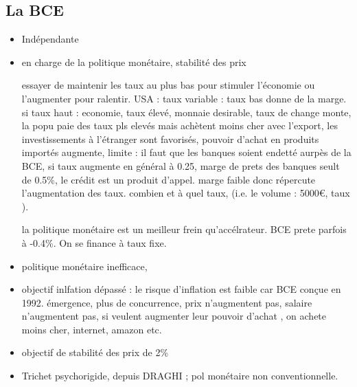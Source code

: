 \documentclass[a4paper,12pt]{article}
\begin{document}
\subsection{La BCE}

\begin{itemize}
	\item Indépendante
	\item en charge de la politique monétaire, stabilité des prix
	
	essayer de maintenir les taux au plus bas pour stimuler l'économie
	ou l'augmenter pour ralentir.
	USA : taux variable : taux bas donne de la marge.
	si taux haut : economie, taux élevé, monnaie desirable, taux de change monte,
	la popu paie des taux pls elevés mais achètent moins cher avec l'export, 
	les investissements à l'étranger sont favorisés, pouvoir d'achat en produits importés augmente,
	limite : il faut que les banques soient endetté aurpès de la BCE, si taux augmente en général à 0.25,
	marge de prets des banques seult de 0.5\%, le crédit est un produit d'appel. marge faible donc répercute
	l'augmentation des taux. combien et à quel taux, (i.e. le volume : 5000€, taux ).
	
	la politique monétaire est un meilleur frein qu'accélrateur. BCE prete parfois à -0.4\%.
	On se finance à taux fixe. 
	
	\item politique monétaire inefficace, 
	\item objectif inlfation dépassé : le risque d'inflation est faible car BCE conçue en 1992.
	émergence, plus de concurrence, prix n'augmentent pas, salaire n'augmentent pas, 
	si veulent augmenter leur pouvoir d'achat , on achete moins cher, internet, amazon etc.
	
	\item objectif de stabilité des prix de 2\%
	
	\item Trichet psychorigide, depuis DRAGHI ; pol monétaire non conventionnelle.
	
\end{itemize}




 

%

%
%

\newpage
\nocite{*}  %


%
%
%
%
\end{document}
